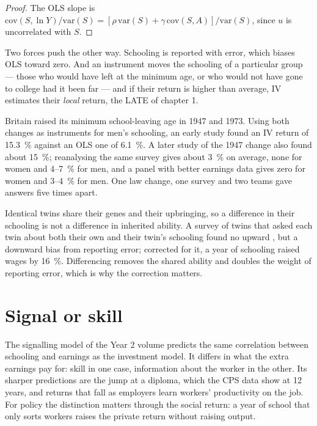 \begin{proof}
The OLS slope is $\mathrm{cov}(S, \ln Y)/\mathrm{var}(S) = [\rho\,\mathrm{var}(S) + \gamma\,\mathrm{cov}(S, A)]/\mathrm{var}(S)$, since $u$ is uncorrelated
with $S$.
\end{proof}

Two forces push the other way. Schooling is reported with error, which biases OLS
toward zero. And an instrument moves the schooling of a particular group --- those
who would have left at the minimum age, or who would not have gone to college had
it been far --- and if their return is higher than average, IV estimates their
\emph{local} return, the LATE of chapter 1.

\begin{record}
Britain raised its minimum school-leaving age in 1947 and 1973. Using both changes
as instruments for men's schooling, an early study found an IV return of 15.3~\% against
an OLS one of 6.1~\%. %
A later study of the 1947 change also found about 15~\%; reanalysing the same survey gives
about 3~\% on average, none for women and 4--7~\% for men, and a panel with better
earnings data gives zero for women and 3--4~\% for men. %
One law change, one survey and two teams gave answers five times apart.
\end{record}

\begin{measure}[Twins]
Identical twins share their genes and their upbringing, so a difference in their
schooling is not a difference in inherited ability. A survey of twins that asked
each twin about both their own and their twin's schooling found no upward , but a downward bias from reporting error; corrected for it, a year of
schooling raised wages by 16~\%. %
Differencing removes the shared ability and doubles the weight of reporting
error, which is why the correction matters.
\end{measure}

\section{Signal or skill}\label{sec:b3:human-capital:signal}

The signalling model of the Year 2 volume predicts the same correlation between
schooling and earnings as the investment model. It differs in what the extra
earnings pay for: skill in one case, information about the worker in the other. Its
sharper predictions are the jump at a diploma, which the CPS data show at 12 years,
and returns that fall as employers learn workers' productivity on the job. For
policy the distinction matters through the social return: a year of school that
only sorts workers raises the private return without raising output.

